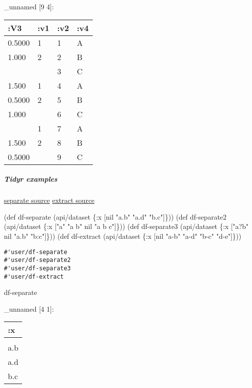 \documentclass[]{article}
\newenvironment{Shaded}{\begin{snugshade}}{\end{snugshade}}
\newcommand{\StringTok}[1]{\textcolor[rgb]{0.31,0.60,0.02}{#1}}
\newcommand{\FunctionTok}[1]{\textcolor[rgb]{0.00,0.00,0.00}{#1}}
\newcommand{\VariableTok}[1]{\textcolor[rgb]{0.00,0.00,0.00}{#1}}
\newcommand{\BuiltInTok}[1]{#1}
\newcommand{\AttributeTok}[1]{\textcolor[rgb]{0.77,0.63,0.00}{#1}}
\newcommand{\NormalTok}[1]{#1}
\let\oldsubparagraph\subparagraph
\renewcommand{\subparagraph}[1]{\oldsubparagraph{#1}\mbox{}}
\begin{document}
\_unnamed {[}9 4{]}:

\begin{longtable}[]{@{}llll@{}}
\toprule
:V3 & :v1 & :v2 & :v4\tabularnewline
\midrule
\endhead
0.5000 & 1 & 1 & A\tabularnewline
1.000 & 2 & 2 & B\tabularnewline
& & 3 & C\tabularnewline
1.500 & 1 & 4 & A\tabularnewline
0.5000 & 2 & 5 & B\tabularnewline
1.000 & & 6 & C\tabularnewline
& 1 & 7 & A\tabularnewline
1.500 & 2 & 8 & B\tabularnewline
0.5000 & & 9 & C\tabularnewline
\bottomrule
\end{longtable}

\subparagraph{Tidyr examples}\label{tidyr-examples-1}

\href{https://tidyr.tidyverse.org/reference/separate.html}{separate
source}
\href{https://tidyr.tidyverse.org/reference/extract.html}{extract
source}

\begin{Shaded}
\begin{Highlighting}[]
\NormalTok{(}\BuiltInTok{def}\FunctionTok{ df-separate }\NormalTok{(api/dataset \{}\AttributeTok{:x}\NormalTok{ [}\VariableTok{nil} \StringTok{"a.b"} \StringTok{"a.d"} \StringTok{"b.c"}\NormalTok{]\}))}
\NormalTok{(}\BuiltInTok{def}\FunctionTok{ df-separate2 }\NormalTok{(api/dataset \{}\AttributeTok{:x}\NormalTok{ [}\StringTok{"a"} \StringTok{"a b"} \VariableTok{nil} \StringTok{"a b c"}\NormalTok{]\}))}
\NormalTok{(}\BuiltInTok{def}\FunctionTok{ df-separate3 }\NormalTok{(api/dataset \{}\AttributeTok{:x}\NormalTok{ [}\StringTok{"a?b"} \VariableTok{nil} \StringTok{"a.b"} \StringTok{"b:c"}\NormalTok{]\}))}
\NormalTok{(}\BuiltInTok{def}\FunctionTok{ df-extract }\NormalTok{(api/dataset \{}\AttributeTok{:x}\NormalTok{ [}\VariableTok{nil} \StringTok{"a-b"} \StringTok{"a-d"} \StringTok{"b-c"} \StringTok{"d-e"}\NormalTok{]\}))}
\end{Highlighting}
\end{Shaded}

\begin{verbatim}
#'user/df-separate
#'user/df-separate2
#'user/df-separate3
#'user/df-extract
\end{verbatim}

\begin{Shaded}
\begin{Highlighting}[]
\NormalTok{df-separate}
\end{Highlighting}
\end{Shaded}

\_unnamed {[}4 1{]}:

\begin{longtable}[]{@{}l@{}}
\toprule
:x\tabularnewline
\midrule
\endhead
\tabularnewline
a.b\tabularnewline
a.d\tabularnewline
b.c\tabularnewline
\bottomrule
\end{longtable}
\end{document}
